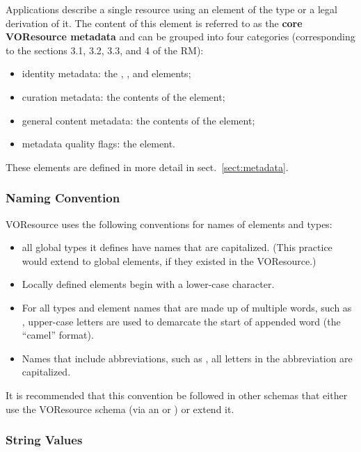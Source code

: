\documentclass[11pt,a4paper]{ivoa}
\begin{document}
Applications describe a single resource using an element of the type
 or a legal derivation of it.  The content of this
element is referred to as the \textbf{core VOResource
metadata} and can be grouped into four categories (corresponding to the
sections 3.1, 3.2, 3.3, and 4 of the RM):

\begin{itemize}
  \item identity metadata:  the ,
       , and
        elements;
  \item curation metadata:  the contents of the
        element;
  \item general content metadata:  the contents of the
        element;
  \item metadata quality flags:  the
        element.
\end{itemize}


These elements are defined in more detail in sect.~\ref{sect:metadata}.


\subsubsection{Naming Convention}

VOResource uses the following conventions for
names of elements and types:

\begin{itemize}
  \item all global types it defines have names that are capitalized.
       (This practice would extend to global elements, if they existed
       in the VOResource.)
  \item Locally defined elements begin with a lower-case character.
  \item For all types and element names that are made up of multiple
       words, such as , upper-case letters are
       used to demarcate the start of appended word (the ``camel''
       format).
  \item Names that include abbreviations, such as
       , all letters in the abbreviation are
       capitalized.
\end{itemize}

It is recommended that this convention be followed in other schemas
that either use the VOResource schema (via an  or
) or extend it.


\subsubsection{String Values}
\end{document}
